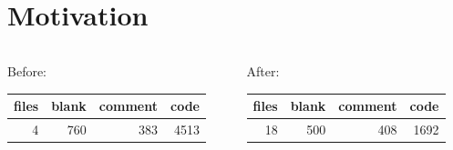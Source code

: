\documentclass[aspectratio=169, 10pt]{beamer}
\begin{document}
\whitetheme

\section{Motivation}
\label{sec:orgb541b99}
\begin{frame}[label={sec:org660391b}]{}
\begin{columns}
\begin{column}{0.38\columnwidth}
Before:
\begin{center}
\begin{tabular}{rrrr}
files & blank & comment & code\\
\hline
4 & 760 & 383 & 4513\\
\end{tabular}
\end{center}
\end{column}
\begin{column}{0.38\columnwidth}
After:
\begin{center}
\begin{tabular}{rrrr}
files & blank & comment & code\\
\hline
18 & 500 & 408 & 1692\\
\end{tabular}
\end{center}
\end{column}
\end{columns}
\end{frame}
\end{document}
